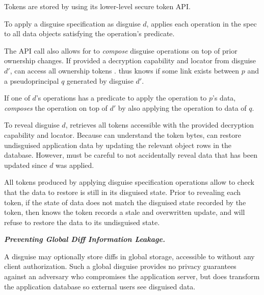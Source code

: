 Tokens are stored by \sys using its lower-level secure token API.

To apply a disguise specification as disguise $d$, \sys applies each operation in the spec to
all data objects satisfying the operation's predicate. 

The  API call also allows for \sys to \emph{compose} disguise operations on top of
prior ownership changes.
If provided a decryption capability and locator  from disguise $d'$, \sys can access all ownership tokens
. \sys thus knows if some link exists between $p$ and a pseudoprincipal $q$ generated by
disguise $d'$.

If one of $d$'s operations has a predicate to apply the operation to $p$'s data, \sys
\emph{composes} the operation on top of $d'$ by also applying the operation to data of $q$.

To reveal disguise $d$, \sys retrieves all tokens accessible with the provided decryption capability
and locator. Because \sys can understand the token bytes, \sys can restore undisguised application
data by updating the relevant object rows in the database.  However, \sys must be
careful to not accidentally reveal data that has been updated since $d$ was applied.  

All tokens produced by applying disguise specification operations allow \sys to check that the data
to restore is still in its disguised state. Prior to revealing each token, if the state of data does
not match the disguised state recorded by the token, then \sys knows the token records a stale and
overwritten update, and will refuse to restore the data to its undisguised state.

\iffalse
\vspace{6pt}\noindent\textbf{\emph{Preventing Global Diff Information Leakage.}}

%
A disguise may optionally store diffs in global storage, accessible to \sys without any client
authorization.
Such a global disguise provides no privacy guarantees against an adversary who compromises 
the application server, but does transform the application database so external users see disguised
data.

